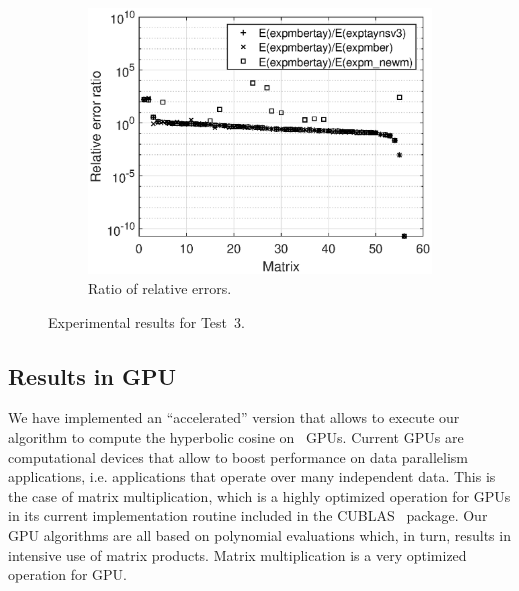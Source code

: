 \begin{figure}[t]
\begin{subfigure}[b]{0.48\textwidth}
\vspace{12pt}
\end{subfigure}
\begin{subfigure}[b]{0.48\textwidth}
\includegraphics[scale=0.4]{Figures/error_ratio_exp_toolbox_n128_nd256-exp_eigtool_n128_nd256_expmbertay.eps}
\caption{\footnotesize Ratio of relative errors.}
\label{fig:test6_c}
\end{subfigure}
\caption{Experimental results for Test~3.}
\label{fig:test6}
\end{figure}


\subsection{Results in GPU}

We have implemented an ``accelerated'' version that allows to execute our algorithm
to compute the hyperbolic cosine on \nvidia\  GPUs.
Current GPUs are computational devices that allow to boost performance on data parallelism applications, i.e. applications that operate over many independent data.
This is the case of matrix multiplication, which is a highly optimized operation for GPUs in its current implementation routine included in the CUBLAS~\cite{CuLi09} package.
Our GPU algorithms are all based on polynomial evaluations which, in turn, results in intensive use of matrix products. 
Matrix multiplication is a very optimized operation for GPU.

